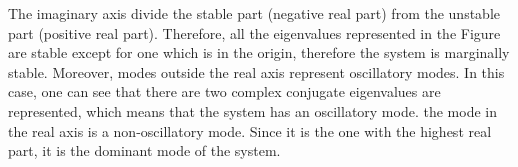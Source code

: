 The imaginary axis divide the stable part (negative real part) from the unstable part (positive real part). Therefore, all the eigenvalues
represented in the Figure are stable except for one which is in the origin, therefore the system is marginally stable. Moreover, modes outside
the real axis represent oscillatory modes. In this case, one can see that there are
two complex conjugate eigenvalues are represented, which means that the system has an oscillatory mode. the mode in the real axis is a non-oscillatory mode.
Since it is the one with the highest real part, it is the dominant mode of the system.



